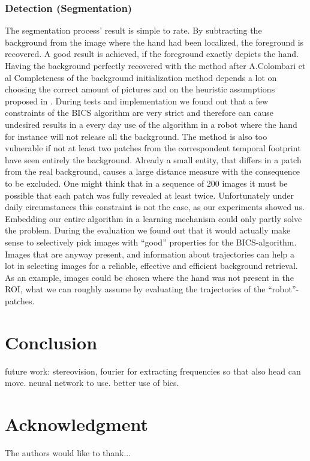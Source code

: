 \documentclass[conference]{IEEEtran}
\begin{document}
\subsubsection{Detection (Segmentation)}
\label{results:evaluation:segmentation}
%
The segmentation process' result is simple to rate. By subtracting the background from the image where the hand had been localized, the foreground is recovered. A good result is achieved, if the foreground exactly depicts the hand. Having the background perfectly recovered with the method after A.Colombari et al \cite{} Completeness of the background initialization method depends a lot on choosing the correct amount of pictures and on the heuristic assumptions proposed in \cite{BICS06}. During tests and implementation we found out that a few constraints of the BICS algorithm are very strict and therefore can cause undesired results in a every day use of the algorithm in a robot where the hand for instance will not release all the background. The method is also too vulnerable if not at least two patches from the correspondent temporal footprint have seen entirely the background. Already a small entity, that differs in a patch from the real background, causes a large distance measure with the consequence to be excluded. One might think that in a sequence of 200 images it must be possible that each patch was fully revealed at least twice. Unfortunately under daily circumstances this constraint is not the case, as our experiments showed us. Embedding our entire algorithm in a learning mechanism could only partly solve the problem. During the evaluation we found out that it would actually make sense to selectively pick images with ``good'' properties for the BICS-algorithm. Images that are anyway present, and information about trajectories can help a lot in selecting images for a reliable, effective and efficient background retrieval. As an example, images could be chosen where the hand was not present in the ROI, what we can roughly assume by evaluating the trajectories of the ``robot''-patches. 

\section{Conclusion}
future work:
stereovision, fourier for extracting frequencies so that also head can move. neural network to use. better use of bics.


\section*{Acknowledgment}
The authors would like to thank...
\end{document}
